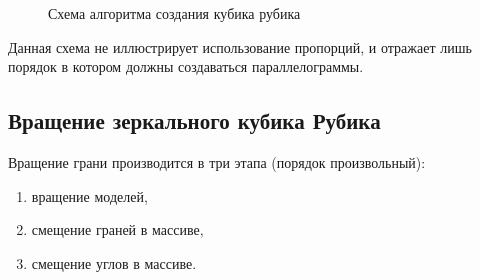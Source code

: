 \documentclass[a4paper, 14pt]{report} %
\begin{document}
	\begin{figure}[!ht]
		\caption{Схема алгоритма создания кубика рубика}
		\label{fig:rubicks_create}
	\end{figure}

	Данная схема не иллюстрирует использование пропорций, и отражает лишь порядок в котором должны создаваться параллелограммы.
	
	\subsection{Вращение зеркального кубика Рубика}
	
	Вращение грани производится в три этапа (порядок произвольный):
	\begin{enumerate}
		\item вращение моделей,
		\item смещение граней в массиве,
		\item смещение углов в массиве.
	\end{enumerate}
\end{document}
